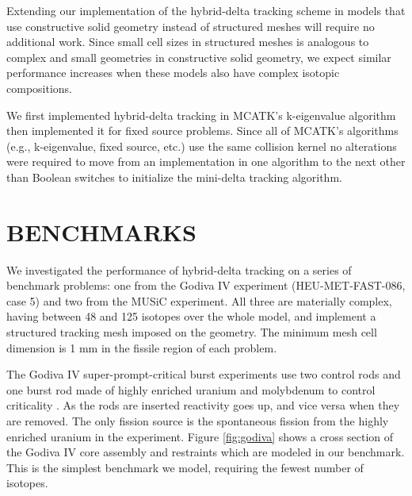 Extending our implementation of the hybrid-delta tracking scheme in models that use constructive solid geometry instead of structured meshes will require no additional work.
Since small cell sizes in structured meshes is analogous to complex and small geometries in constructive solid geometry, we expect similar performance increases when these models also have complex isotopic compositions.

We first implemented hybrid-delta tracking in MCATK's k-eigenvalue algorithm then implemented it for fixed source problems.
Since all of MCATK's algorithms (e.g., k-eigenvalue, fixed source, etc.) use the same collision kernel no alterations were required to move from an implementation in one algorithm to the next other than Boolean switches to initialize the mini-delta tracking algorithm.


\section{BENCHMARKS}
\label{sec:mcatkbenchmarks}
We investigated the performance of hybrid-delta tracking on a series of benchmark problems: one from the Godiva IV experiment (HEU-MET-FAST-086, case 5) and two from the MUSiC experiment.
All three are materially complex, having between 48 and 125 isotopes over the whole model, and implement a structured tracking mesh imposed on the geometry. 
The minimum mesh cell dimension is 1 mm in the fissile region of each problem.

The Godiva IV super-prompt-critical burst experiments use two control rods and one burst rod made of highly enriched uranium and molybdenum to control criticality \cite{osti_9564352009}.
As the rods are inserted reactivity goes up, and vice versa when they are removed.
The only fission source is the spontaneous fission from the highly enriched uranium in the experiment.
Figure \ref{fig:godiva} shows a cross section of the Godiva IV core assembly and restraints which are modeled in our benchmark.
This is the simplest benchmark we model, requiring the fewest number of isotopes. 

